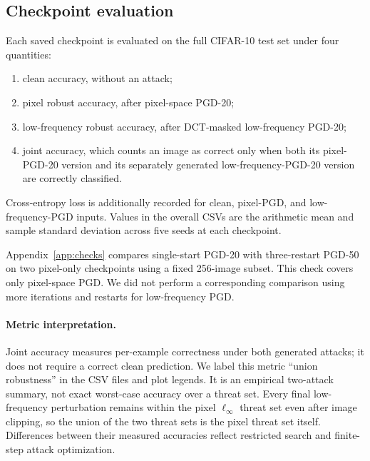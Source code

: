 \documentclass[11pt]{article}
\newcommand{\linf}{\ell_\infty}
\begin{document}
\subsection{Checkpoint evaluation}
Each saved checkpoint is evaluated on the full CIFAR-10 test set under four
quantities:
\begin{enumerate}
  \item clean accuracy, without an attack;
  \item pixel robust accuracy, after pixel-space PGD-20;
  \item low-frequency robust accuracy, after DCT-masked low-frequency PGD-20;
  \item joint accuracy, which counts an image as correct only when both its
  pixel-PGD-20 version and its separately generated low-frequency-PGD-20
  version are correctly classified.
\end{enumerate}
Cross-entropy loss is additionally recorded for clean, pixel-PGD, and
low-frequency-PGD inputs. Values in the overall CSVs are the arithmetic mean
and sample standard deviation across five seeds at each checkpoint.

Appendix~\ref{app:checks} compares single-start PGD-20 with three-restart PGD-50
on two pixel-only checkpoints using a fixed 256-image subset. This check
covers only pixel-space PGD. We did not perform a corresponding comparison
using more iterations and restarts for low-frequency PGD.

\paragraph{Metric interpretation.}
Joint accuracy measures per-example correctness under both generated
attacks; it does not require a correct clean prediction. We label this metric
``union robustness'' in the CSV files and plot legends. It is an empirical two-attack
summary, not exact worst-case accuracy over a threat set. Every final
low-frequency perturbation remains within the pixel $\linf$ threat set even
after image clipping, so the union of the two threat sets is the pixel threat
set itself. Differences between their measured accuracies reflect restricted
search and finite-step attack optimization.
\end{document}
